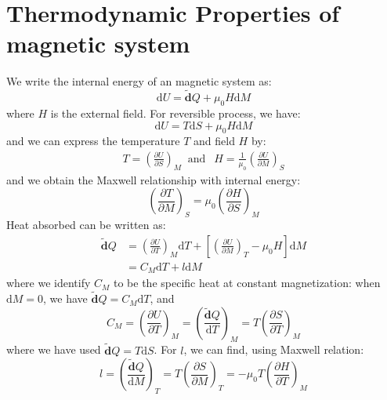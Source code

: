 \documentclass{article}
\newcommand{\pfrac}[2]{\frac{\partial #1}{\partial #2}}
\newcommand{\dbar}{\mathbf{\tilde{d}}}
\newcommand{\dnor}{\text{d}}
\begin{document}
\section{Thermodynamic Properties of magnetic system}
We write the internal energy of an magnetic system as:
\begin{equation}
    \dnor U = \dbar Q + \mu_0 H \dnor M
\end{equation}
where $H$ is the external field. For reversible process, we have:
\begin{equation}
    \dnor U = T \dnor S + \mu_0 H \dnor M
\end{equation}
and we can express the temperature $T$ and field $H$ by:
\begin{align}
    T = \left(\pfrac{U}{S}\right)_M \ \text{ and }\ \ H = \frac{1}{\mu_0} \left(\pfrac{U}{M}\right)_S
\end{align}
and we obtain the Maxwell relationship with internal energy:
\begin{equation}
    \left( \pfrac{T}{M} \right)_S = \mu_0 \left( \pfrac{H}{S} \right)_M
\end{equation}
Heat absorbed can be written as:
\begin{align}
    \dbar Q &= \left(\pfrac{U}{T}\right)_M \dnor T + \left[ \left(\pfrac{U}{M}\right)_T -\mu_0 H \right] \dnor M \\
            &= C_M \dnor T + l \dnor M \label{q_cm}
\end{align}
where we identify $C_M$ to be the specific heat at constant magnetization: when $\dnor M = 0$, we have $\dbar Q = C_M \dnor T$, and
\begin{equation}
    C_M = \left(\pfrac{U}{T}\right)_M = \left(\frac{\dbar Q}{\dnor T}\right)_M = T \left(\pfrac{S}{T}\right)_M
\end{equation}
where we have used $\dbar Q = T \dnor S$. For $l$, we can find, using Maxwell relation:
\begin{equation}
    l = \left( \frac{\dbar Q}{\dnor M} \right)_T = T \left(\pfrac{S}{M}\right)_T = - \mu_0 T \left(\pfrac{H}{T}\right)_M
\end{equation}
\end{document}
